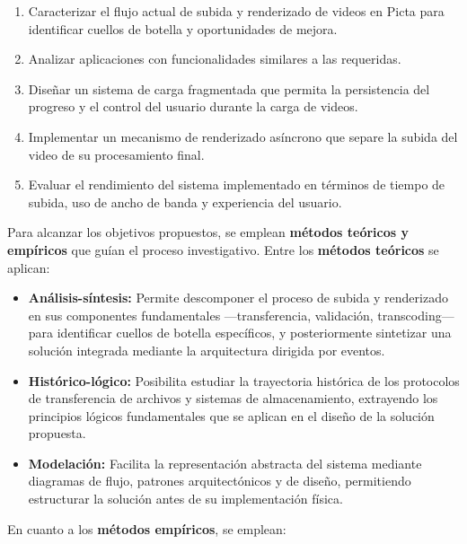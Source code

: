 \begin{enumerate}
  \item Caracterizar el flujo actual de subida y renderizado de videos en Picta para identificar
  cuellos de botella y oportunidades de mejora.

  \item Analizar aplicaciones con funcionalidades similares a las requeridas.

  \item Diseñar un sistema de carga fragmentada que permita la persistencia del progreso y el
  control del usuario durante la carga de videos.

  \item Implementar un mecanismo de renderizado asíncrono que separe la subida del video de su
  procesamiento final.

  \item Evaluar el rendimiento del sistema implementado en términos de tiempo de subida, uso de
  ancho de banda y experiencia del usuario.
\end{enumerate}

Para alcanzar los objetivos propuestos, se emplean \textbf{métodos teóricos y empíricos} que 
guían el proceso investigativo. Entre los \textbf{métodos teóricos} se aplican:

\begin{itemize}
  \item \textbf{Análisis-síntesis:} Permite descomponer el proceso de subida y renderizado en 
  sus componentes fundamentales ---transferencia, validación, transcoding--- para identificar 
  cuellos de botella específicos, y posteriormente sintetizar una solución integrada mediante la 
  arquitectura dirigida por eventos.

  \item \textbf{Histórico-lógico:} Posibilita estudiar la trayectoria histórica de los 
  protocolos de transferencia de archivos y sistemas de almacenamiento, extrayendo los principios 
  lógicos fundamentales que se aplican en el diseño de la solución propuesta.

  \item \textbf{Modelación:} Facilita la representación abstracta del sistema mediante diagramas 
  de flujo, patrones arquitectónicos y de diseño, permitiendo estructurar la solución antes de su 
  implementación física.
\end{itemize}

En cuanto a los \textbf{métodos empíricos}, se emplean:


